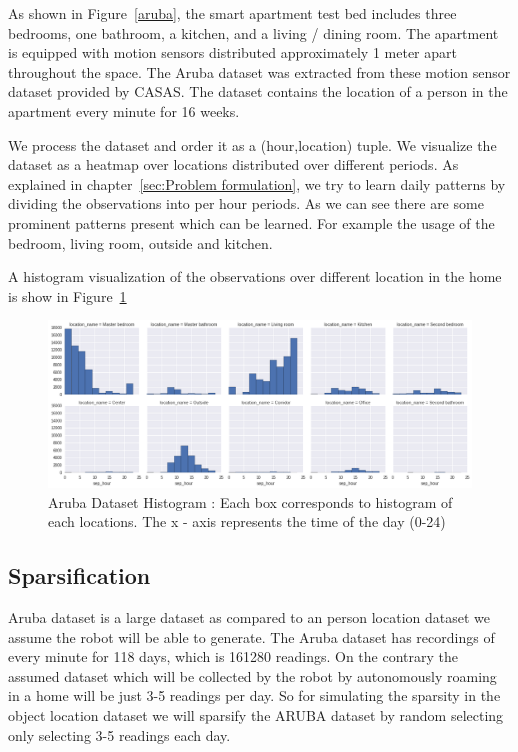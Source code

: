 As shown in Figure~\ref{aruba}, the smart apartment test bed includes three bedrooms, one bathroom, a kitchen, and a living / dining room.  The apartment is equipped with motion sensors distributed approximately 1 meter apart throughout the space. The Aruba dataset was extracted from these motion sensor dataset provided by CASAS. The dataset contains the location of a person in the apartment every minute for 16 weeks.

We process the dataset and  order it as a  (hour,location) tuple. We visualize the dataset as a heatmap over locations distributed over different periods. As explained in chapter~\ref{sec:Problem formulation}, we try to learn daily patterns by dividing the observations into per hour periods. As we can see there are some prominent patterns present which can be learned. For example the usage of the bedroom, living room, outside and kitchen.

A histogram visualization of the observations over different location in the home is show in Figure~\ref{aruba-hist}

\begin{figure}[htp]
\centering
\includegraphics[width=\textwidth]{images/aruba-hist.png}
\caption[Aruba dataset histogram]{Aruba Dataset Histogram : Each box corresponds to histogram of each locations. The x - axis represents the time of the day (0-24) }
\label{aruba-hist}
\end{figure}


\subsection*{Sparsification}
Aruba dataset is a large dataset as compared to an person location dataset we assume the robot will be able to generate. The Aruba dataset has recordings of every minute for 118 days, which is 161280 readings.
On the contrary the assumed dataset which will be collected by the robot by autonomously roaming in a home will be just 3-5 readings per day.
So for simulating the sparsity in the object location dataset we will sparsify the ARUBA dataset by random selecting only selecting 3-5 readings each day.

